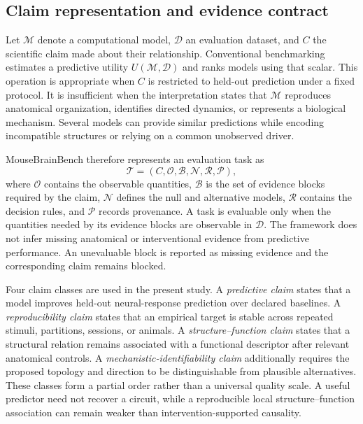 \subsection{Claim representation and evidence contract}
\label{subsec:claim-contract}

Let $\mathcal{M}$ denote a computational model, $\mathcal{D}$ an evaluation
dataset, and $C$ the scientific claim made about their relationship.
Conventional benchmarking estimates a predictive utility
$U(\mathcal{M},\mathcal{D})$ and ranks models using that scalar. This operation
is appropriate when $C$ is restricted to held-out prediction under a fixed
protocol. It is insufficient when the interpretation states that
$\mathcal{M}$ reproduces anatomical organization, identifies directed
dynamics, or represents a biological mechanism. Several models can provide
similar predictions while encoding incompatible structures or relying on a
common unobserved driver.

MouseBrainBench therefore represents an evaluation task as
\[
\mathcal{T}=\left(C,\mathcal{O},\mathcal{B},\mathcal{N},\mathcal{R},\mathcal{P}\right),
\]
where $\mathcal{O}$ contains the observable quantities, $\mathcal{B}$ is the
set of evidence blocks required by the claim, $\mathcal{N}$ defines the null
and alternative models, $\mathcal{R}$ contains the decision rules, and
$\mathcal{P}$ records provenance. A task is evaluable only when the quantities
needed by its evidence blocks are observable in $\mathcal{D}$. The framework
does not infer missing anatomical or interventional evidence from predictive
performance. An unevaluable block is reported as missing evidence and the
corresponding claim remains blocked.

Four claim classes are used in the present study. A \emph{predictive claim}
states that a model improves held-out neural-response prediction over declared
baselines. A \emph{reproducibility claim} states that an empirical target is
stable across repeated stimuli, partitions, sessions, or animals. A
\emph{structure--function claim} states that a structural relation remains
associated with a functional descriptor after relevant anatomical controls. A
\emph{mechanistic-identifiability claim} additionally requires the proposed
topology and direction to be distinguishable from plausible alternatives.
These classes form a partial order rather than a universal quality scale. A
useful predictor need not recover a circuit, while a reproducible local
structure--function association can remain weaker than intervention-supported
causality.

